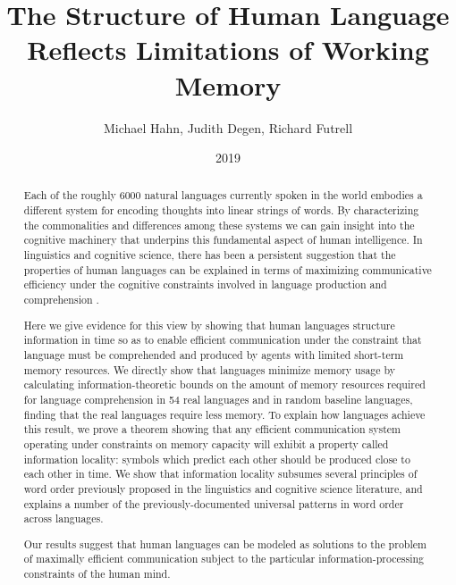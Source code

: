\documentclass[12pt]{article}
\title{The Structure of Human Language Reflects Limitations of Working Memory}
\author{Michael Hahn, Judith Degen, Richard Futrell}
\date{2019}
\date{}
\newcounter{theorem}
\begin{document}
\baselineskip24pt


\maketitle

\begin{abstract}
  Each of the roughly 6000 natural languages currently spoken in the world embodies a different system for encoding thoughts into linear strings of words.
  By characterizing the commonalities and differences among these systems we can gain insight into the cognitive machinery that underpins this fundamental aspect of human intelligence. 
  In linguistics and cognitive science, there has been a persistent suggestion that the properties of human languages can be explained in terms of maximizing communicative efficiency under the cognitive constraints involved in language production and comprehension \citep{gibson2019efficiency,florian,hawkins,piantadosi2011word,zipf1949}.

  Here we give evidence for this view by showing that human languages structure information in time so as to enable efficient communication under the constraint that language must be comprehended and produced by agents with limited short-term memory resources.
  We directly show that languages minimize memory usage by calculating information-theoretic bounds on the amount of memory resources required for language comprehension in 54 real languages and in random baseline languages, finding that the real languages require less memory.
  To explain how languages achieve this result, we prove a theorem showing that any efficient communication system operating under constraints on memory capacity will exhibit a property called information locality: symbols which predict each other should be produced close to each other in time.
  We show that information locality subsumes several principles of word order previously proposed in the linguistics and cognitive science literature, and explains a number of the previously-documented universal patterns in word order across languages.
  
  Our results suggest that human languages can be modeled as solutions to the problem of maximally efficient communication subject to the particular information-processing constraints of the human mind. 
\end{abstract}
\end{document}
